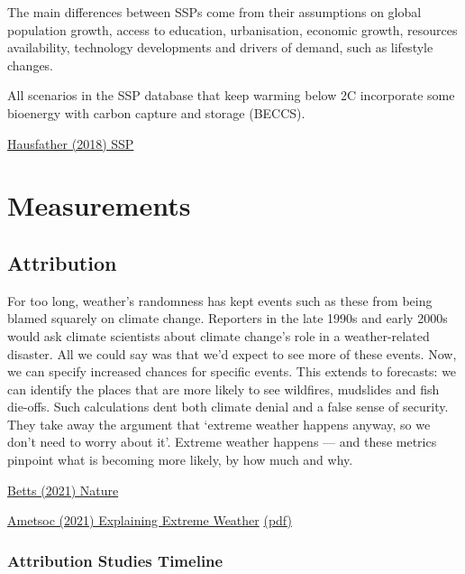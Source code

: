 \documentclass[
]{book}
\begin{document}
The main differences between SSPs come from their assumptions on global population growth, access to education, urbanisation, economic growth, resources availability, technology developments and drivers of demand, such as lifestyle changes.

All scenarios in the SSP database that keep warming below 2C incorporate some bioenergy with carbon capture and storage (BECCS).

\href{https://www.carbonbrief.org/explainer-how-shared-socioeconomic-pathways-explore-future-climate-change}{Hausfather (2018) SSP}

\hypertarget{part-measurements}{%
\part{Measurements}\label{part-measurements}}

\hypertarget{attribution}{%
\chapter{Attribution}\label{attribution}}

For too long, weather's randomness has kept events such as these from being blamed squarely on climate change. Reporters in the late 1990s and early 2000s would ask climate scientists about climate change's role in a weather-related disaster. All we could say was that we'd expect to see more of these events. Now, we can specify increased chances for specific events. This extends to forecasts: we can identify the places that are more likely to see wildfires, mudslides and fish die-offs. Such calculations dent both climate denial and a false sense of security. They take away the argument that `extreme weather happens anyway, so we don't need to worry about it'. Extreme weather happens --- and these metrics pinpoint what is becoming more likely, by how much and why.

\href{https://www.nature.com/articles/d41586-021-00185-x}{Betts (2021) Nature}

\href{https://www.ametsoc.org/ams/index.cfm/publications/bulletin-of-the-american-meteorological-society-bams/explaining-extreme-events-from-a-climate-perspective/}{Ametsoc (2021) Explaining Extreme Weather}
\href{pdf/Ametsoc_2021_Explaining_Extreme_2019.pdf}{(pdf)}

\hypertarget{attribution-studies-timeline}{%
\section{Attribution Studies Timeline}\label{attribution-studies-timeline}}
\end{document}
